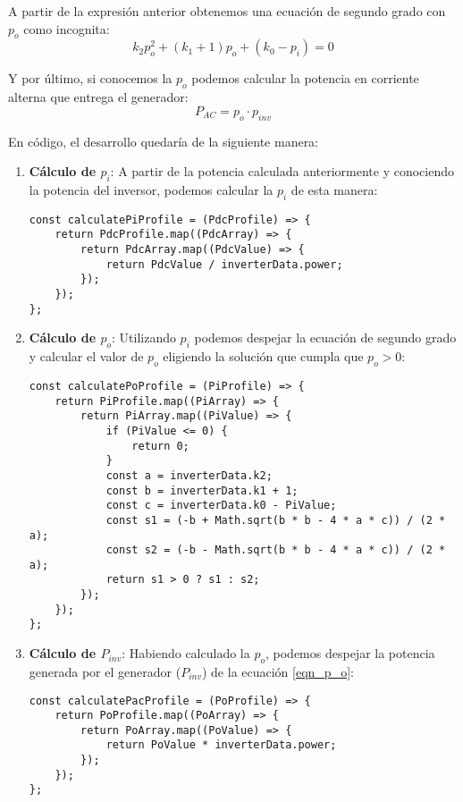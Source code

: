 A partir de la expresión anterior obtenemos una ecuación de segundo grado con $p_o$ como incognita:
\begin{equation}
k_2p_o^2 + (k_1 + 1)p_o + (k_0 - p_i) = 0
\end{equation}

Y por último, si conocemos la $p_o$ podemos calcular la potencia en corriente alterna que entrega el generador:
\begin{equation}
P_{AC} = p_o \cdot p_{inv}
\end{equation}

En código, el desarrollo quedaría de la siguiente manera:

\begin{enumerate}
\item \textbf{Cálculo de $p_i$}: A partir de la potencia calculada anteriormente y conociendo la potencia del inversor, podemos calcular la $p_i$ de esta manera:

\begin{lstlisting}[style=ES6, caption={Cálculo de $p_i$}]
const calculatePiProfile = (PdcProfile) => {
	return PdcProfile.map((PdcArray) => {
		return PdcArray.map((PdcValue) => {
			return PdcValue / inverterData.power;
		});
	});
};
\end{lstlisting}

\item \textbf{Cálculo de $p_o$}: Utilizando $p_i$ podemos despejar la ecuación de segundo grado y calcular el valor de $p_o$ eligiendo la solución que cumpla que $p_o > 0$:

\begin{lstlisting}[style=ES6, caption={Cálculo de $p_o$}]
const calculatePoProfile = (PiProfile) => {
	return PiProfile.map((PiArray) => {
		return PiArray.map((PiValue) => {
			if (PiValue <= 0) {
				return 0;
			}
			const a = inverterData.k2;
			const b = inverterData.k1 + 1;
			const c = inverterData.k0 - PiValue;
			const s1 = (-b + Math.sqrt(b * b - 4 * a * c)) / (2 * a);
			const s2 = (-b - Math.sqrt(b * b - 4 * a * c)) / (2 * a);
			return s1 > 0 ? s1 : s2;
		});
	});
};
\end{lstlisting}

\item \textbf{Cálculo de $P_{inv}$}: Habiendo calculado la $p_o$, podemos despejar la potencia generada por el generador ($P_{inv}$) de la ecuación \ref{eqn_p_o}:

\begin{lstlisting}[style=ES6, caption={Cálculo de $P_{AC}$}]
const calculatePacProfile = (PoProfile) => {
	return PoProfile.map((PoArray) => {
		return PoArray.map((PoValue) => {
			return PoValue * inverterData.power;
		});
	});
};
\end{lstlisting}



\end{enumerate}
